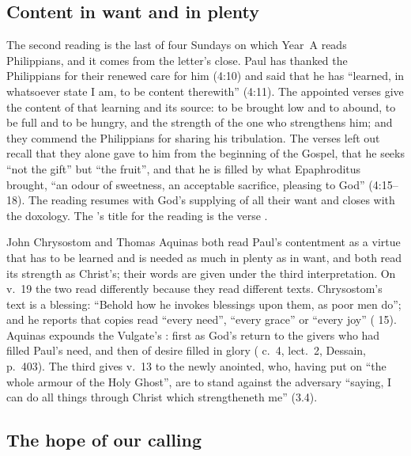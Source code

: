 \subsection{Content in want and in plenty}

The second reading is the last of four Sundays on which Year~A reads
Philippians, and it comes from the letter's close. Paul has thanked the
Philippians for their renewed care for him (4:10) and said that he has
``learned, in whatsoever state I am, to be content therewith'' (4:11). The
appointed verses give the content of that learning and its source: to be
brought low and to abound, to be full and to be hungry, and the strength of
the one who strengthens him; and they commend the Philippians for sharing his
tribulation. The verses left out recall that they alone gave to him from the
beginning of the Gospel, that he seeks ``not the gift'' but ``the fruit'', and
that he is filled by what Epaphroditus brought, ``an odour of sweetness, an
acceptable sacrifice, pleasing to God'' (4:15--18). The reading resumes with
God's supplying of all their want and closes with the doxology. The
's title for the reading is the verse .

John Chrysostom and Thomas Aquinas both read Paul's contentment as a virtue
that has to be learned and is needed as much in plenty as in want, and both
read its strength as Christ's; their words are given under the third
interpretation. On v.~19 the two read differently because they read different
texts. Chrysostom's text is a blessing: ``Behold how he invokes blessings upon
them, as poor men do''; and he reports that copies read ``every need'', ``every
grace'' or ``every joy'' ( 15). Aquinas expounds
the Vulgate's : first as God's return to the
givers who had filled Paul's need, and then of desire filled in glory ( c.~4, lect.~2,
Dessain, p.~403). The third  gives v.~13 to the
newly anointed, who, having put on ``the whole armour of the Holy Ghost'', are
to stand against the adversary ``saying, I can do all things through Christ
which strengtheneth me'' (3.4).

\subsection{The hope of our calling}


